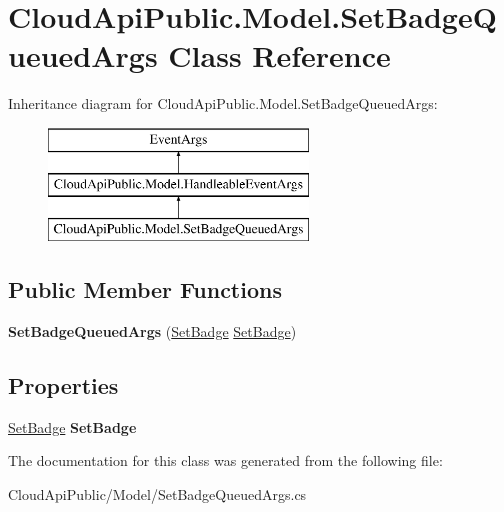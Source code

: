 \hypertarget{class_cloud_api_public_1_1_model_1_1_set_badge_queued_args}{\section{Cloud\-Api\-Public.\-Model.\-Set\-Badge\-Queued\-Args Class Reference}
\label{class_cloud_api_public_1_1_model_1_1_set_badge_queued_args}
}
Inheritance diagram for Cloud\-Api\-Public.\-Model.\-Set\-Badge\-Queued\-Args\-:\begin{figure}[H]
\begin{center}
\leavevmode
\includegraphics[height=3.000000cm]{class_cloud_api_public_1_1_model_1_1_set_badge_queued_args}
\end{center}
\end{figure}
\subsection*{Public Member Functions}
\begin{DoxyCompactItemize}
\item 
\hypertarget{class_cloud_api_public_1_1_model_1_1_set_badge_queued_args_a03d165268df9b7e6c2111ab57bd8dd6a}{{\bfseries Set\-Badge\-Queued\-Args} (\hyperlink{struct_cloud_api_public_1_1_model_1_1_set_badge}{Set\-Badge} \hyperlink{struct_cloud_api_public_1_1_model_1_1_set_badge}{Set\-Badge})}\label{class_cloud_api_public_1_1_model_1_1_set_badge_queued_args_a03d165268df9b7e6c2111ab57bd8dd6a}

\end{DoxyCompactItemize}
\subsection*{Properties}
\begin{DoxyCompactItemize}
\item 
\hypertarget{class_cloud_api_public_1_1_model_1_1_set_badge_queued_args_afdb23a184806ed77e15657e1aa389dc9}{\hyperlink{struct_cloud_api_public_1_1_model_1_1_set_badge}{Set\-Badge} {\bfseries Set\-Badge}}\label{class_cloud_api_public_1_1_model_1_1_set_badge_queued_args_afdb23a184806ed77e15657e1aa389dc9}

\end{DoxyCompactItemize}


The documentation for this class was generated from the following file\-:\begin{DoxyCompactItemize}
\item 
Cloud\-Api\-Public/\-Model/Set\-Badge\-Queued\-Args.\-cs\end{DoxyCompactItemize}

